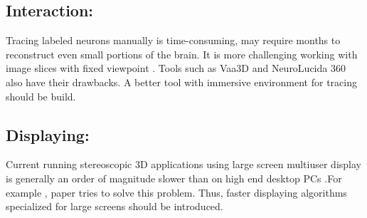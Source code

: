 \documentclass[10pt,twocolumn,letterpaper]{article}
\begin{document}


\subsection{Interaction:}Tracing labeled neurons manually is time-consuming, may require months to reconstruct even small portions of the brain. It is more challenging working with image slices with fixed viewpoint \cite{Usher2018}. Tools such as Vaa3D and NeuroLucida 360 also have their drawbacks. A better tool with immersive environment for tracing should be build.
\subsection{Displaying:}Current running stereoscopic 3D applications using large screen multiuser display is generally an order of magnitude slower than on high end desktop PCs .For example , paper \cite{Wiebrands2018} tries to solve this problem. Thus, faster displaying algorithms specialized for large screens should be introduced. 

{\small


}
\end{document}
